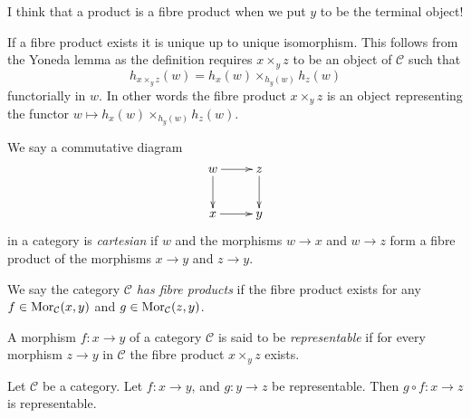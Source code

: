 \begin{remark}
\label{remark-product-is-fibre-product}
I think that a product is a fibre product
when we put $y$ to be the terminal object!
\end{remark}


\noindent
If a fibre product exists it is unique up to unique
isomorphism. This follows from the Yoneda lemma as
the definition requires $x \times_y z$ to be an object
of $\mathcal{C}$ such that
$$
h_{x \times_y z}(w) = h_x(w) \times_{h_y(w)} h_z(w)
$$
functorially in $w$. In other words the fibre product $x \times_y z$
is an object representing the functor
$w \mapsto h_x(w) \times_{h_y(w)} h_z(w)$.

\begin{definition}
\label{definition-cartesian}
We say a commutative diagram
$$
\xymatrix{
w \ar[r] \ar[d] &
z \ar[d] \\
x \ar[r] &
y
}
$$
in a category is {\it cartesian} if $w$ and the morphisms $w \to x$ and
$w \to z$ form a fibre product of the morphisms $x \to y$ and $z \to y$.
\end{definition}

\begin{definition}
\label{definition-has-fibre-products}
We say the category $\mathcal{C}$ {\it has fibre products} if
the fibre product exists for any $f\in \mathop{\mathrm{Mor}}\nolimits_{\mathcal C}(x, y)$
and $g\in \mathop{\mathrm{Mor}}\nolimits_{\mathcal C}(z, y)$.
\end{definition}

\begin{definition}
\label{definition-representable-morphism}
A morphism $f : x \to y$ of a category $\mathcal{C}$ is said to be
{\it representable} if for every morphism $z \to y$
in $\mathcal{C}$ the fibre product $x \times_y z$ exists.
\end{definition}

\begin{lemma}
\label{lemma-composition-representable}
Let $\mathcal{C}$ be a category.
Let $f : x \to y$, and $g : y \to z$ be representable.
Then $g \circ f : x \to z$ is representable.
\end{lemma}

